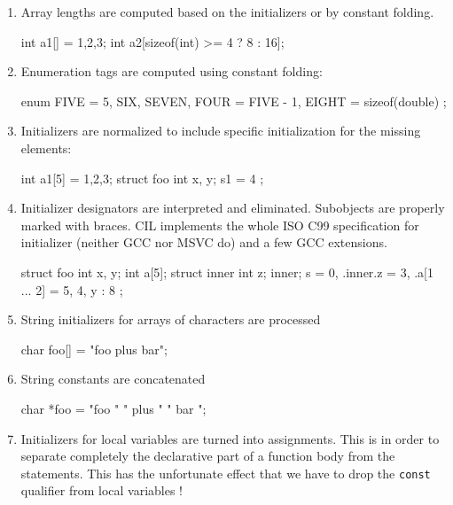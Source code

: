 \documentclass{article}
\def\t#1{{\tt #1}}
\begin{document}
\begin{enumerate}
\item Array lengths are computed based on the initializers or by constant
folding.
\begin{cilcode}[global]
  int a1[] = {1,2,3};
  int a2[sizeof(int) >= 4 ? 8 : 16];
\end{cilcode}

\item Enumeration tags are computed using constant folding:
\begin{cilcode}[global]
  enum { 
     FIVE = 5, 
     SIX, SEVEN, 
     FOUR = FIVE - 1, 
     EIGHT = sizeof(double)
  };
\end{cilcode}

\item Initializers are normalized to include specific initialization for the
missing elements:
\begin{cilcode}[global]
  int a1[5] = {1,2,3};
  struct foo { int x, y; } s1 = { 4 };
\end{cilcode}

\item Initializer designators are interpreted and eliminated. Subobjects are
properly marked with braces. CIL implements
the whole ISO C99 specification for initializer (neither GCC nor MSVC do) and
a few GCC extensions. 
\begin{cilcode}[global]
  struct foo { 
     int x, y; 
     int a[5];
     struct inner {
        int z;
     } inner;
  } s = { 0, .inner.z = 3, .a[1 ... 2] = 5, 4, y : 8 };
\end{cilcode}

\item String initializers for arrays of characters are processed

\begin{cilcode}[global]
char foo[] = "foo plus bar";
\end{cilcode}

\item String constants are concatenated

\begin{cilcode}[global]
char *foo = "foo " " plus " " bar ";
\end{cilcode}

\item Initializers for local variables are turned into assignments. This is in
order to separate completely the declarative part of a function body from the
statements. This has the unfortunate effect that we have to drop the \t{const}
qualifier from local variables !


\end{enumerate}
\end{document}
